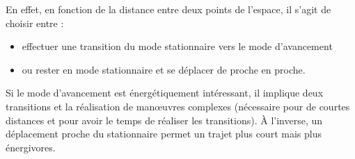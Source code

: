 En effet, en fonction de la distance entre deux points de l'espace, il s'agit de choisir entre :
\begin{itemize}
    \item effectuer une transition du mode stationnaire vers le mode d'avancement 
    \item ou rester en mode stationnaire et se déplacer de proche en proche.
\end{itemize}

Si le mode d'avancement est énergétiquement intéressant, il implique deux transitions et la réalisation de manœuvres complexes (nécessaire pour de courtes distances et pour avoir le temps de réaliser les transitions). À l'inverse, un déplacement proche du stationnaire permet un trajet plus court mais plus énergivores.




